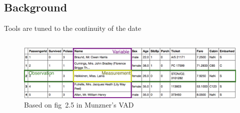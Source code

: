 \documentclass[xcolor={dvipsnames}, handout]{beamer}
\begin{document}
\subsection{Background}
\begin{frame}{Tools are tuned to the continuity of the date \cite{HeerSoftware2006,toryRethinkingVisualizationHighlevel2004}}
    \begin{columns}
        \begin{figure}
            \includegraphics[width=1\textwidth]{figures/intro/data_formatting.png}
            \caption{Based on fig~2.5 in Munzner's VAD\cite{munznerVisualizationAnalysisDesign2014}}
        \end{figure}
    

\end{columns}
\end{frame}
\end{document}
